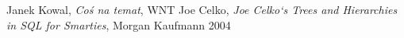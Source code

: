%
%

\clearpage
{}
{}
\begin{thebibliography}{99}
\thispagestyle{empty}

 Janek Kowal, 
    \emph{Coś na temat}, 
    WNT
 Joe Celko, 
    \emph{Joe Celko`s Trees and Hierarchies in SQL for Smarties}, 
    Morgan Kaufmann 2004

\end{thebibliography} 


